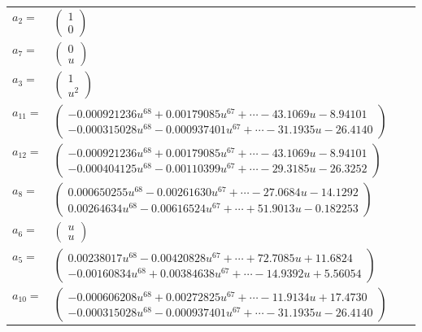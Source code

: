 \documentclass[1p]{elsarticle_modified}
\theoremstyle{definition}
\begin{document}
\begin{tabular}{m{7pt} m{180pt} m{7pt} m{180pt} }
\flushright $a_{2}=$&$\begin{pmatrix}1\\0\end{pmatrix}$ \\
\flushright $a_{7}=$&$\begin{pmatrix}0\\u\end{pmatrix}$ \\
\flushright $a_{3}=$&$\begin{pmatrix}1\\u^2\end{pmatrix}$ \\
\flushright $a_{11}=$&$\begin{pmatrix}-0.000921236 u^{68}+0.00179085 u^{67}+\cdots-43.1069 u-8.94101\\-0.000315028 u^{68}-0.000937401 u^{67}+\cdots-31.1935 u-26.4140\end{pmatrix}$ \\
\flushright $a_{12}=$&$\begin{pmatrix}-0.000921236 u^{68}+0.00179085 u^{67}+\cdots-43.1069 u-8.94101\\-0.000404125 u^{68}-0.00110399 u^{67}+\cdots-29.3185 u-26.3252\end{pmatrix}$ \\
\flushright $a_{8}=$&$\begin{pmatrix}0.000650255 u^{68}-0.00261630 u^{67}+\cdots-27.0684 u-14.1292\\0.00264634 u^{68}-0.00616524 u^{67}+\cdots+51.9013 u-0.182253\end{pmatrix}$ \\
\flushright $a_{6}=$&$\begin{pmatrix}u\\u\end{pmatrix}$ \\
\flushright $a_{5}=$&$\begin{pmatrix}0.00238017 u^{68}-0.00420828 u^{67}+\cdots+72.7085 u+11.6824\\-0.00160834 u^{68}+0.00384638 u^{67}+\cdots-14.9392 u+5.56054\end{pmatrix}$ \\
\flushright $a_{10}=$&$\begin{pmatrix}-0.000606208 u^{68}+0.00272825 u^{67}+\cdots-11.9134 u+17.4730\\-0.000315028 u^{68}-0.000937401 u^{67}+\cdots-31.1935 u-26.4140\end{pmatrix}$ \\

\end{tabular}
\end{document}
